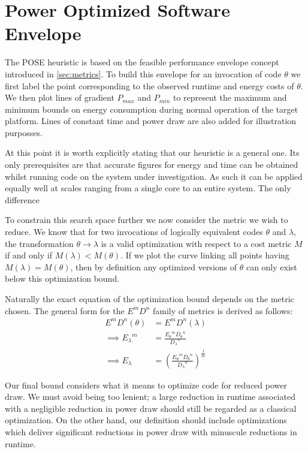 \section{Power Optimized Software Envelope}
\label{sec:pose}

The POSE heuristic is based on the feasible performance envelope concept introduced in \autoref{sec:metrics}.
To build this envelope for an invocation of code $\theta$ we first label the point corresponding to the observed runtime and energy costs of $\theta$.
We then plot lines of gradient $P_{max}$ and $P_{min}$ to represent the maximum and minimum bounds on energy consumption during normal operation of the target platform.
Lines of constant time and power draw are also added for illustration purposses.

At this point it is worth explicitly stating that our heuristic is a general one.
Its only prerequisites are that accurate figures for energy and time can be obtained whilst running code on the system under investigation.
As such it can be applied equally well at scales ranging from a single core to an entire system. 
The only difference 


To constrain this search space further we now consider the metric we wish to reduce. We know that for two invocations of logically equivalent codes $\theta$ and $\lambda$, the transformation $\theta \to \lambda$ is a valid optimization with respect to a cost metric $M$ if and only if $M(\lambda) < M(\theta)$. If we plot the curve linking all points having $M(\lambda) = M(\theta)$, then by definition any optimized versions of $\theta$ can only exist below this optimization bound.

Naturally the exact equation of the optimization bound depends on the metric chosen. 
The general form for the $E^mD^n$ family of metrics is derived as follows:
\begin{align}
E^mD^n(\theta) &= E^mD^n(\lambda) \nonumber \\
\implies {E_\lambda}^m &= \frac{{E_\theta}^m{D_\theta}^n}{{D_\lambda}^n} \nonumber \\
\implies E_\lambda &= (\frac{{E_\theta}^m{D_\theta}^n}{{D_\lambda}^n})^\frac{1}{m}
\end{align}

Our final bound considers what it means to optimize code for reduced power draw. We must avoid being too lenient; a large reduction in runtime associated with a negligible reduction in power draw should still be regarded as a classical optimization. On the other hand, our definition should include optimizations which deliver significant reductions in power draw with minuscule reductions in runtime. 

